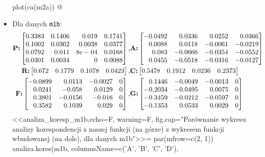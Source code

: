 \documentclass[12pt]{mwart}
\begin{document}
\begin{itemize}[label=$\bullet$]
  	  plot(ca(m2a))
  	@
  \item Dla danych \verb|m1b|:
    \begin{align}
		  \text{\textbf{P:}}
		  \begin{bmatrix*}[r]
			0.3383 & 0.1406 & 0.019& 0.1741 \\
			0.1002 & 0.0362 & 0.0038 & 0.0377 \\
			0.0792 & 0.011 & 8e-04 & 0.0168 \\
			0.0301 & 0.0034 & 0 & 0.0088
		\end{bmatrix*}, &
      \text{\textbf{A:}}
      \begin{bmatrix*}[r]
			-0.0492 & 0.0336 &  0.0252 & 0.0366 \\
			0.0088 &  0.0118 & -0.0061 & -0.0219 \\
			0.083 & -0.0666 & -0.0354 & -0.0552 \\
			0.0455 & -0.0518 & -0.0316 & -0.0127
		\end{bmatrix*} \\
      \text{\textbf{R:}}
      \begin{bmatrix*}[r]
0.672 & 0.1779 & 0.1078 & 0.0423
\end{bmatrix*}, &
      \text{\textbf{C:}}
      \begin{bmatrix*}[r]
0.5478 & 0.1912 & 0.0236 & 0.2373
\end{bmatrix*} \\
      \text{\textbf{F:}}
      \begin{bmatrix*}[r]
			-0.0899 & 0.0113 & -0.0027 & 0 \\
			0.0241 & -0.058 &  0.0129 & 0 \\
			0.3801 & -0.0156 & -0.016 & 0 \\
			0.3582 &  0.1039 &  0.029 & 0
		\end{bmatrix*}, & 
      \text{\textbf{G:}}
      \begin{bmatrix*}[r]
			0.1446 & -0.0049 & -0.0013 & 0 \\
			-0.2034 & -0.0495 &  0.0075 & 0 \\
			-0.3459 & -0.0212 & -0.0597 & 0 \\
			-0.1353 &  0.0533 &  0.0029 & 0
		\end{bmatrix*}
    \end{align}
    <<analiza_koresp_m1b,echo=F, warning=F, fig.cap="Porównanie wykresu analizy korespondencji z naszej funkcji (na górze) z wykresem funkcji wbudowanej (na dole), dla danych m1b">>=
    par(mfrow=c(2, 1))
  	  analiza.kores(m1b, columnsName=c('A', 'B', 'C', 'D'), 

\end{itemize}
\end{document}
